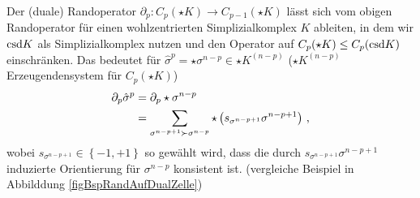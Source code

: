   \begin{folgerung}
    Der (duale) Randoperator \( \partial_{p}: C_{p}(\star K) \rightarrow C_{p-1}(\star K) \) lässt sich vom obigen Randoperator für einen wohlzentrierten Simplizialkomplex \( K \) ableiten, 
    in dem wir \( \text{csd} K \) als Simplizialkomplex nutzen und den Operator auf \( C_{p}(\star K) \le C_{p}(\text{csd} K) \) einschränken.
    Das bedeutet für \( \hat{\sigma}^{p} = \star\sigma^{n-p} \in \star K^{(n-p)} \) (\( \star K^{(n-p)} \) Erzeugendensystem für \(  C_{p}(\star K) \))
    \begin{align}
      \partial_{p} \hat{\sigma}^{p} &= \partial_{p}\star\sigma^{n-p} \\
                                    &= \sum_{\sigma^{n-p+1} \succ \sigma^{n-p}} \star \left( s_{\sigma^{n-p+1}} \sigma^{n-p+1} \right) \,\text{,}
    \end{align}
    wobei \( s_{\sigma^{n-p+1}} \in \left\{ -1,+1 \right\} \) so gewählt wird, dass die durch \( s_{\sigma^{n-p+1}} \sigma^{n-p+1} \) induzierte Orientierung für
    \( \sigma^{n-p} \) konsistent ist. (vergleiche Beispiel in Abbilddung \ref{figBspRandAufDualZelle})
  \end{folgerung}
